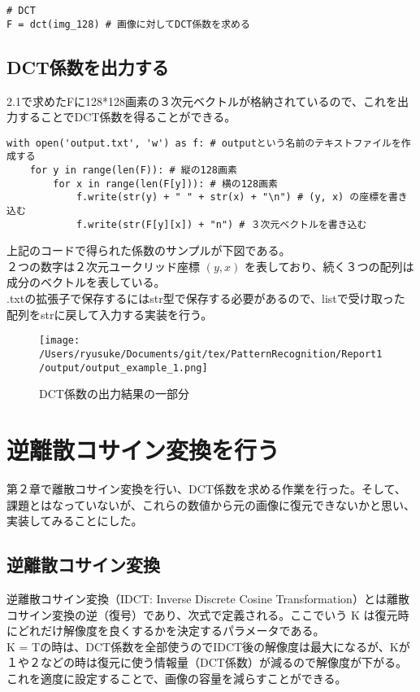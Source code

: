 \documentclass[dvipdfmx,uplatex]{jsarticle}
\begin{document}
\begin{spacing}{1.4}
\begin{lstlisting}[caption=DCT係数を求めるソースコード]
# DCT
F = dct(img_128) # 画像に対してDCT係数を求める

\end{lstlisting}

\subsection{DCT係数を出力する}
2.1で求めたFに128*128画素の３次元ベクトルが格納されているので、これを出力することでDCT係数を得ることができる。

\begin{lstlisting}[caption=DCT係数を出力するソースコード]
with open('output.txt', 'w') as f: # outputという名前のテキストファイルを作成する
    for y in range(len(F)): # 縦の128画素
        for x in range(len(F[y])): # 横の128画素
            f.write(str(y) + " " + str(x) + "\n") # (y, x) の座標を書き込む
            f.write(str(F[y][x]) + "n") # ３次元ベクトルを書き込む
\end{lstlisting}

上記のコードで得られた係数のサンプルが下図である。\\
２つの数字は２次元ユークリッド座標 $(y, x)$ を表しており、続く３つの配列は成分のベクトルを表している。\\
.txtの拡張子で保存するにはstr型で保存する必要があるので、listで受け取った配列をstrに戻して入力する実装を行う。
\begin{figure}[htbp]
\begin{center}
\texttt{[image: /Users/ryusuke/Documents/git/tex/PatternRecognition/Report1/output/output\_example\_1.png]}
\caption{DCT係数の出力結果の一部分}
\end{center}
\end{figure}

\newpage

\section{逆離散コサイン変換を行う}
第２章で離散コサイン変換を行い、DCT係数を求める作業を行った。そして、課題とはなっていないが、これらの数値から元の画像に復元できないかと思い、実装してみることにした。
\subsection{逆離散コサイン変換}
逆離散コサイン変換（IDCT: Inverse Discrete Cosine Transformation）とは離散コサイン変換の逆（復号）であり、次式で定義される。ここでいう K は復元時にどれだけ解像度を良くするかを決定するパラメータである。\\
K = Tの時は、DCT係数を全部使うのでIDCT後の解像度は最大になるが、Kが１や２などの時は復元に使う情報量（DCT係数）が減るので解像度が下がる。これを適度に設定することで、画像の容量を減らすことができる。\\


\end{spacing}
\end{document}

